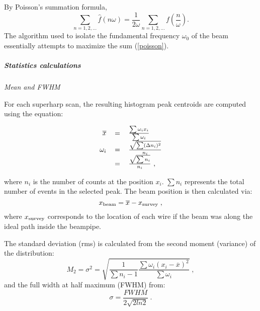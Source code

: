 By Poisson's summation formula, 
\begin{equation}\label{poisson}
\sum_{n=1, 2,\ldots} \hat f(n\omega) =
	\frac{1}{2\omega}\sum_{n=1, 2, \ldots} f\left(\frac{n}{\omega}\right).
\end{equation}
The algorithm used to isolate the fundamental frequency $\omega_0$ of the beam essentially attempts to
maximize the sum (\ref{poisson}).

	\subparagraph{Statistics calculations}

	{\sl Mean and FWHM}

For each superharp scan, the resulting histogram peak centroids are computed using the equation:
\begin{center}
\begin{equation}
\begin{tabular}{rcl}
$\overline{x}$&$ = $&$ \frac{\sum \omega_i x_i}{\sum \omega_i}	$\\
$\omega_i    $&$ = $&$ \frac{\sqrt{\sum (\Delta n_i)^2}}{n_i} $\\
              &$ = $&$ \frac{\sqrt{\sum n_i}}{n_i} $\ ,
\end{tabular}
\end{equation}
\end{center}
\noindent
where $n_i$ is the number of counts at the position $x_i$. $\sum n_i$ represents
the total number of events in the selected peak. The beam position is then calculated via:
\begin{equation}
x_{\rm beam} = \overline{x} - x_{\rm survey} \; ,
\end{equation}
where $x_{\rm survey}$ corresponds to the location of each wire if the beam was along the
ideal path inside the beampipe.

The standard deviation (rms) is calculated from the second moment (variance) of the
distribution:
\begin{equation}
M_2 = \sigma^2 =
	\sqrt{\frac{1}{\sum n_i-1}\frac{\sum \omega_i (x_i-\overline{x})^2}{\sum \omega_i}} \; ,
\end{equation}
and the full width at half maximum (FWHM) from:
\begin{equation}
\sigma = \frac{FWHM}{2\sqrt{2ln2}} \; .
\end{equation}

